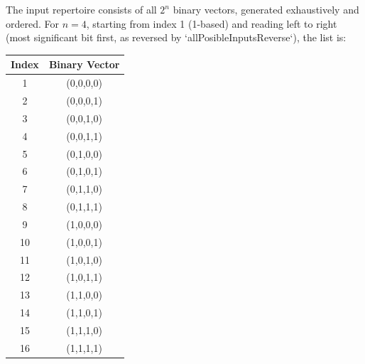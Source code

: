 \documentclass[12pt]{article}
\begin{document}
The input repertoire consists of all \( 2^n \) binary vectors, generated exhaustively and ordered. For \( n = 4 \), starting from index 1 (1-based) and reading left to right (most significant bit first, as reversed by `allPosibleInputsReverse`), the list is:
\begin{center}
\begin{tabular}{c|c}
\textbf{Index} & \textbf{Binary Vector} \\
\hline
1 & (0,0,0,0) \\
2 & (0,0,0,1) \\
3 & (0,0,1,0) \\
4 & (0,0,1,1) \\
5 & (0,1,0,0) \\
6 & (0,1,0,1) \\
7 & (0,1,1,0) \\
8 & (0,1,1,1) \\
9 & (1,0,0,0) \\
10 & (1,0,0,1) \\
11 & (1,0,1,0) \\
12 & (1,0,1,1) \\
13 & (1,1,0,0) \\
14 & (1,1,0,1) \\
15 & (1,1,1,0) \\
16 & (1,1,1,1) \\
\end{tabular}
\end{center}
\end{document}
